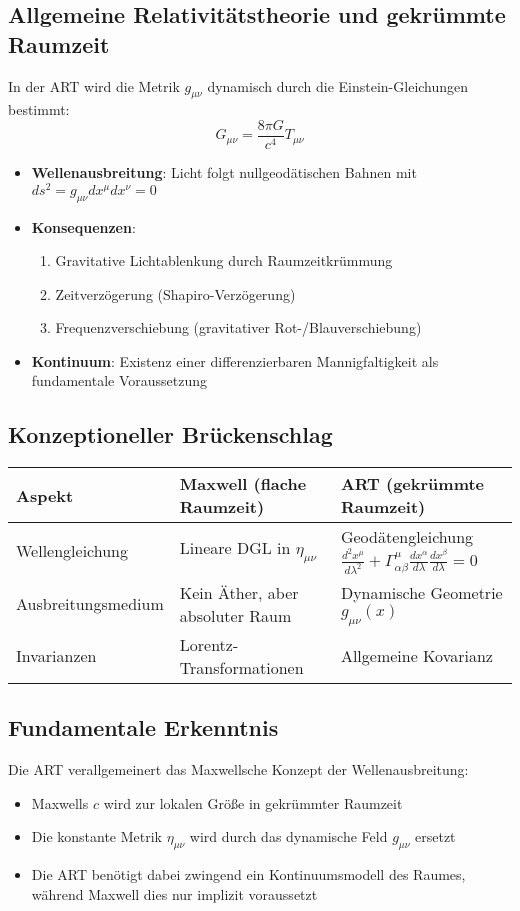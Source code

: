 \subsection{Allgemeine Relativitätstheorie und gekrümmte Raumzeit}
In der ART wird die Metrik $g_{\mu\nu}$ dynamisch durch die Einstein-Gleichungen bestimmt:
\[
G_{\mu\nu} = \frac{8\pi G}{c^4}T_{\mu\nu}
\]
\begin{itemize}
    \item \textbf{Wellenausbreitung}: Licht folgt nullgeodätischen Bahnen mit $ds^2 = g_{\mu\nu}dx^\mu dx^\nu = 0$
    \item \textbf{Konsequenzen}:
    \begin{enumerate}
        \item Gravitative Lichtablenkung durch Raumzeitkrümmung
        \item Zeitverzögerung (Shapiro-Verzögerung)
        \item Frequenzverschiebung (gravitativer Rot-/Blauverschiebung)
    \end{enumerate}
    \item \textbf{Kontinuum}: Existenz einer differenzierbaren Mannigfaltigkeit als fundamentale Voraussetzung
\end{itemize}

\subsection{Konzeptioneller Brückenschlag}
\begin{tabular}{|l|l|l|}
\hline
\textbf{Aspekt} & \textbf{Maxwell (flache Raumzeit)} & \textbf{ART (gekrümmte Raumzeit)} \\
\hline
Wellengleichung & Lineare DGL in $\eta_{\mu\nu}$ & Geodätengleichung $\frac{d^2x^\mu}{d\lambda^2} + \Gamma^\mu_{\alpha\beta}\frac{dx^\alpha}{d\lambda}\frac{dx^\beta}{d\lambda} = 0$ \\
\hline
Ausbreitungsmedium & Kein Äther, aber absoluter Raum & Dynamische Geometrie $g_{\mu\nu}(x)$ \\
\hline
Invarianzen & Lorentz-Transformationen & Allgemeine Kovarianz \\
\hline
\end{tabular}

\subsection*{Fundamentale Erkenntnis}
Die ART verallgemeinert das Maxwellsche Konzept der Wellenausbreitung:
\begin{itemize}
    \item Maxwells $c$ wird zur lokalen Größe in gekrümmter Raumzeit
    \item Die konstante Metrik $\eta_{\mu\nu}$ wird durch das dynamische Feld $g_{\mu\nu}$ ersetzt
    \item Die ART benötigt dabei zwingend ein Kontinuumsmodell des Raumes, während Maxwell dies nur implizit voraussetzt
\end{itemize}
